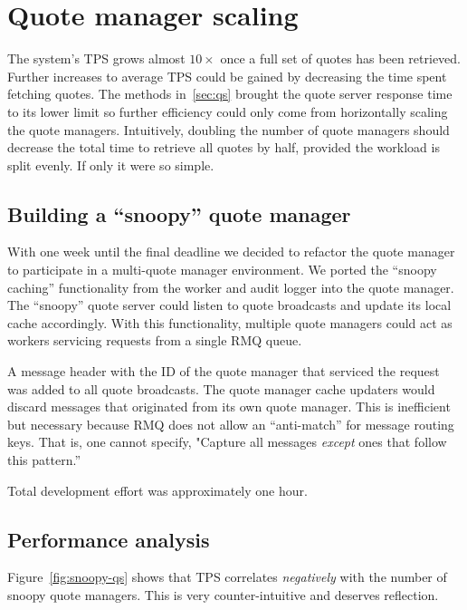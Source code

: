 \section{Quote manager scaling}
The system's TPS grows almost $10\times$ once a full set of quotes has been retrieved.
Further increases to average TPS could be gained by decreasing the time spent fetching quotes.
The methods in~\ref{sec:qs} brought the quote server response time to its lower limit so further efficiency could only come from horizontally scaling the quote managers.
Intuitively, doubling the number of quote managers should decrease the total time to retrieve all quotes by half, provided the workload is split evenly.
If only it were so simple.

\subsection{Building a ``snoopy'' quote manager}
With one week until the final deadline we decided to refactor the quote manager to participate in a multi-quote manager environment.
We ported the ``snoopy caching'' functionality from the worker and audit logger into the quote manager.
The ``snoopy'' quote server could listen to quote broadcasts and update its local cache accordingly.
With this functionality, multiple quote managers could act as workers servicing requests from a single RMQ queue. 

A message header with the ID of the quote manager that serviced the request was added to all quote broadcasts.
The quote manager cache updaters would discard messages that originated from its own quote manager.
This is inefficient but necessary because RMQ does not allow an ``anti-match'' for message routing keys.
That is, one cannot specify, "Capture all messages \textit{except} ones that follow this pattern.''

Total development effort was approximately one hour.

\subsection{Performance analysis}
Figure~\ref{fig:snoopy-qs} shows that TPS correlates \textit{negatively} with the number of snoopy quote managers.
This is very counter-intuitive and deserves reflection.

